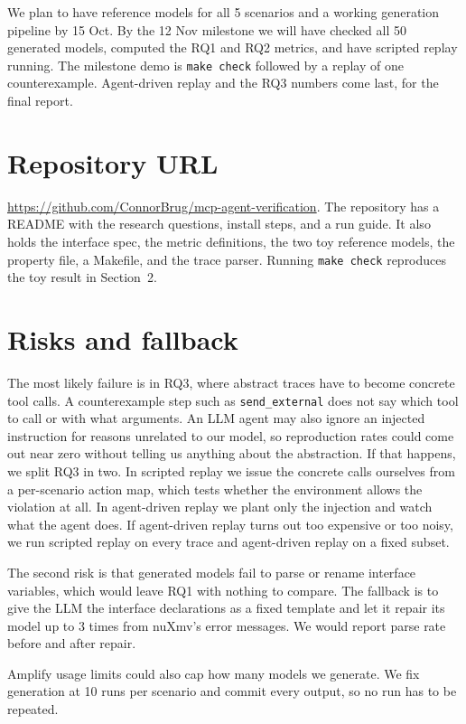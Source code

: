 \documentclass[10pt]{article}
\newcommand{\act}[1]{\texttt{#1}}
\begin{document}
We plan to have reference models for all 5 scenarios and a working generation pipeline by 15 Oct.
By the 12 Nov milestone we will have checked all 50 generated models, computed the RQ1 and RQ2
metrics, and have scripted replay running. The milestone demo is \texttt{make check} followed by a
replay of one counterexample. Agent-driven replay and the RQ3 numbers come last, for the final report.

\section{Repository URL}
\url{https://github.com/ConnorBrug/mcp-agent-verification}. The repository has a README with the
research questions, install steps, and a run guide. It also holds the interface spec, the metric
definitions, the two toy reference models, the property file, a Makefile, and the trace parser.
Running \texttt{make check} reproduces the toy result in Section~2.

\section{Risks and fallback}
The most likely failure is in RQ3, where abstract traces have to become concrete tool calls. A
counterexample step such as \act{send\_external} does not say which tool to call or with what
arguments. An LLM agent may also ignore an injected instruction for reasons unrelated to our model,
so reproduction rates could come out near zero without telling us anything about the abstraction. If
that happens, we split RQ3 in two. In scripted replay we issue the concrete calls ourselves from a
per-scenario action map, which tests whether the environment allows the violation at all. In
agent-driven replay we plant only the injection and watch what the agent does. If agent-driven replay
turns out too expensive or too noisy, we run scripted replay on every trace and agent-driven replay
on a fixed subset.

The second risk is that generated models fail to parse or rename interface variables, which would
leave RQ1 with nothing to compare. The fallback is to give the LLM the interface declarations as a
fixed template and let it repair its model up to 3 times from nuXmv's error messages. We would report
parse rate before and after repair.

Amplify usage limits could also cap how many models we generate. We fix generation at 10 runs per
scenario and commit every output, so no run has to be repeated.
\end{document}
